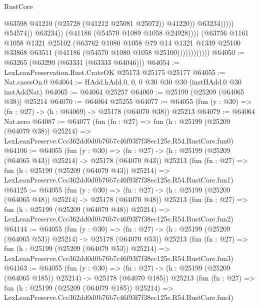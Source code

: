 \begin{lexlean}{RustCore}
\begin{coremodule}
                                              @63598
                                              @41210
                                              (@25728 (@41212 @25081 @25072))
                                              @41220))
                                          @63234)))))
                                @54574))
                            @63234))
                        (@41186 (@54570 @1089 @1058 @24928))))
                    (@63756
                      @1161
                      @1058
                      @1321
                      @25102
                      (@63762
                        @1080
                        @1058
                        @79
                        @14
                        @1321
                        @1339
                        @25100
                        @33868
                        @63511
                        (@41186 (@54570 @1080 @1058 @25100))))))))))))
@64050 := @63265 (@63290 (@63331 (@63333 @64046)))
@64054 := LexLeanPreservation.Rust.CrateOK @25173 @25175 @25177
@64055 := Nat.casesOn.{0}
@64064 := HAdd.hAdd.{0, 0, 0} @30 @30 @30 (instHAdd.{0} @30 instAddNat)
@64065 := @64064 @25257
@64069 := @25199 (@25209 (@64065 @38)) @25214
@64070 := @64064 @25255
@64077 := @64055 (fun (y : @30) => (fn : @27) -> (h : @64069) -> @25178 (@64070 @38)) @25213
@64079 := @64064 Nat.zero
@64087 := @64077
    (fun (fn : @27) =>
    fun (h : @25199 (@25209 (@64079 @38)) @25214) =>
    LexLeanPreserve.Ccc362dd0d0b76b7c46f93f7f38ec125e.R54.RustCore.fun0)
@64106 := @64055
    (fun (y : @30) =>
    (fn : @27) -> (h : @25199 (@25209 (@64065 @43)) @25214) -> @25178 (@64070 @43))
    @25213
    (fun (fn : @27) =>
    fun (h : @25199 (@25209 (@64079 @43)) @25214) =>
    LexLeanPreserve.Ccc362dd0d0b76b7c46f93f7f38ec125e.R54.RustCore.fun1)
@64125 := @64055
    (fun (y : @30) =>
    (fn : @27) -> (h : @25199 (@25209 (@64065 @48)) @25214) -> @25178 (@64070 @48))
    @25213
    (fun (fn : @27) =>
    fun (h : @25199 (@25209 (@64079 @48)) @25214) =>
    LexLeanPreserve.Ccc362dd0d0b76b7c46f93f7f38ec125e.R54.RustCore.fun2)
@64144 := @64055
    (fun (y : @30) =>
    (fn : @27) -> (h : @25199 (@25209 (@64065 @53)) @25214) -> @25178 (@64070 @53))
    @25213
    (fun (fn : @27) =>
    fun (h : @25199 (@25209 (@64079 @53)) @25214) =>
    LexLeanPreserve.Ccc362dd0d0b76b7c46f93f7f38ec125e.R54.RustCore.fun3)
@64163 := @64055
    (fun (y : @30) =>
    (fn : @27) -> (h : @25199 (@25209 (@64065 @185)) @25214) -> @25178 (@64070 @185))
    @25213
    (fun (fn : @27) =>
    fun (h : @25199 (@25209 (@64079 @185)) @25214) =>
    LexLeanPreserve.Ccc362dd0d0b76b7c46f93f7f38ec125e.R54.RustCore.fun4)

\end{coremodule}
\end{lexlean}
